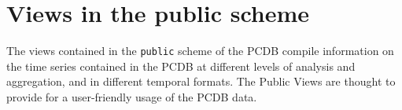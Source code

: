 \section{Views in the public scheme}\label{sec_views_in_public_scheme}
The views contained in the \texttt{\footnotesize public} scheme of the PCDB compile information on the time series contained in the PCDB at different levels of analysis and aggregation, and in different temporal formats. The Public Views are thought to provide for a user-friendly usage of the PCDB data. 

		
		
